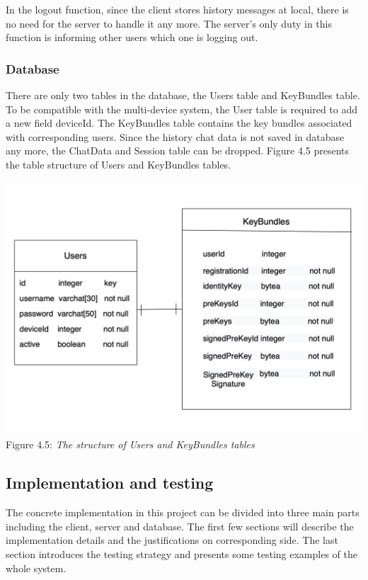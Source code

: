 In the logout function, since the client stores history messages at local, there is no need for the server to handle it any more. The server's only duty in this function is informing other users which one is logging out.
\subsubsection{Database}
There are only two tables in the database, the Users table and KeyBundles table. To be compatible with the multi-device system, the User table is required to add a new field deviceId. The KeyBundles table contains the key bundles associated with corresponding users. Since the history chat data is not saved in database any more, the ChatData and Session table can be dropped. Figure 4.5 presents the table structure of Users and KeyBundles tables.

\begin{center}
\includegraphics[scale=.4]{../4-Implementation/resources/Figure4-5.png}\\
Figure 4.5: \textit{The structure of Users and KeyBundles tables}
\end{center}

\subsection{Implementation and testing}
The concrete implementation in this project can be divided into three main parts including the client, server and database. The first few sections will describe the implementation details and the justifications on corresponding side. The last section introduces the testing strategy and presents some testing examples of the whole system.
